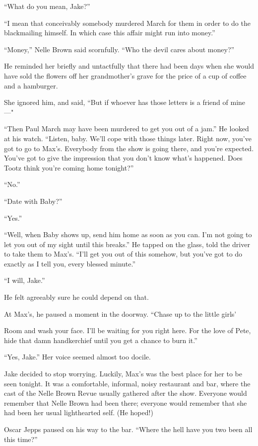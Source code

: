 \documentclass{novel}
\begin{document}
“What do you mean, Jake?”

“I mean that conceivably somebody murdered March for them in order to do the blackmailing himself. In which case this affair might run into money.”

“Money,” Nelle Brown said scornfully. “Who the devil cares about money?”

He reminded her briefly and untactfully that there had been days when she would have sold the flowers off her grandmother’s grave for the price of a cup of coffee and a hamburger.

She ignored him, and said, “But if whoever has those letters is a friend of mine—"

“Then Paul March may have been murdered to get you out of a jam.” He looked at his watch. “Listen, baby. We’ll cope with those things later. Right now, you’ve got to go to Max’s. Everybody from the show is going there, and you’re expected. You’ve got to give the impression that you don’t know what’s happened. Does Tootz think you’re coming home tonight?”

“No.”

“Date with Baby?”

“Yes.”

“Well, when Baby shows up, send him home as soon as you can. I’m not going to let you out of my sight until this breaks.” He tapped on the glass, told the driver to take them to Max’s. “I’ll get you out of this somehow, but you’ve got to do exactly as I tell you, every blessed minute.”

“I will, Jake.”

He felt agreeably sure he could depend on that.

At Max’s, he paused a moment in the doorway. “Chase up to the little girls’

Room and wash your face. I’ll be waiting for you right here. For the love of Pete, hide that damn handkerchief until you get a chance to burn it.”

“Yes, Jake.” Her voice seemed almost too docile.

Jake decided to stop worrying. Luckily, Max’s was the best place for her to be seen tonight. It was a comfortable, informal, noisy restaurant and bar, where the cast of the Nelle Brown Revue usually gathered after the show. Everyone would remember that Nelle Brown had been there; everyone would remember that she had been her usual lighthearted self. (He hoped!)

Oscar Jepps paused on his way to the bar. “Where the hell have you two been all this time?”
\end{document}
